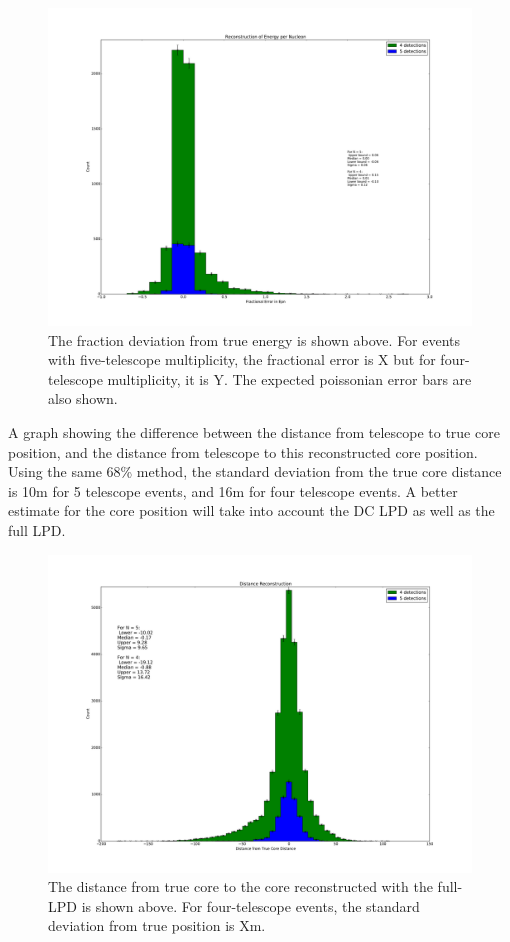 \documentclass[11pt]{article}
\begin{document}
\begin{figure}
\begin{center}
\includegraphics[width=\textwidth]{rawepn}
\caption{The fraction deviation from true energy is shown above. For events with five-telescope multiplicity, the fractional error is X but for four-telescope multiplicity, it is Y. The expected poissonian error bars are also shown.}
\label{fig:rawepn}
\end{center}
\end{figure}  
A graph showing the difference between the distance from telescope to true core position, and the distance from telescope to this reconstructed core position. Using the same 68\% method, the standard deviation from the true core distance  is 10m for 5 telescope events, and 16m for four telescope events. A better estimate for the core position will take into account the DC LPD as well as the full LPD.

\begin{figure}
\begin{center}
\includegraphics[width=\textwidth]{rawcoredistance}
\caption{The distance from true core to the core reconstructed with the full-LPD is shown above. For four-telescope events, the standard deviation from true position is Xm. }
\label{fig:rawcoredistance}
\end{center}
\end{figure} 
\end{document}
